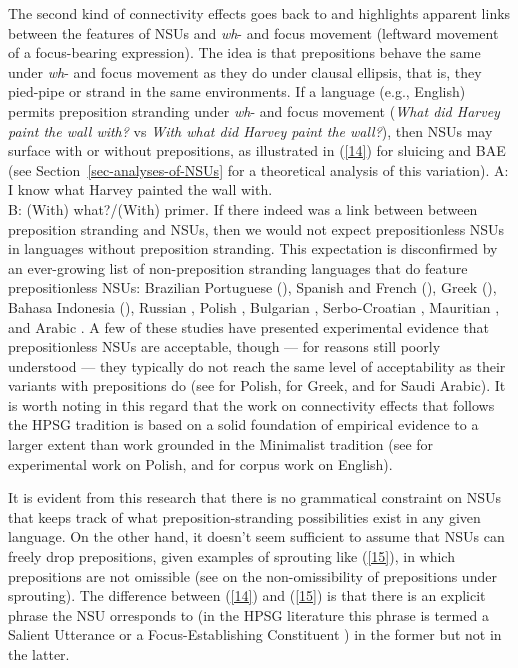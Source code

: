 {The second kind of connectivity effects goes back to \citet{Merchant2001, Merchant2005a} and highlights apparent links between the features of NSUs and \emph{wh}- and focus movement (leftward movement of a focus-bearing expression). The idea is that prepositions behave the same under \emph{wh}- and focus movement as they do under clausal ellipsis, that is, they pied-pipe or strand in the same environments. If a language (e.g., English) permits preposition stranding under \emph{wh}- and focus movement (\emph{What did Harvey paint the wall with?} vs \emph{With what did Harvey paint the wall?}), then NSUs may surface with or without prepositions, as illustrated in (\ref{14}) for sluicing and BAE (see Section~\ref{sec-analyses-of-NSUs} for a theoretical analysis of this variation).
%
\ea A: I know what Harvey painted the wall with.\\B: (With) what?/(With) primer.\label{14}\z
%
If there indeed was a link between between preposition stranding and NSUs, then we would not expect prepositionless NSUs in languages without preposition stranding. This expectation is disconfirmed by an ever-growing list of non-preposition stranding languages that do feature prepositionless NSUs: Brazilian Portuguese (\citealt{AlmeidaYoshida2007}), Spanish and French (\citealt{Rodrigues2006}), Greek (\citealt{Molimpakis2018}), Bahasa Indonesia (\citealt{Fortin2007}), %
 Russian \citep{Philippova2014}, Polish \citep{Szczegielniak2008, Sag2011, Nykiel2013}, %
Bulgarian \citep{Abels2017}, Serbo-Croatian \citep{Stjepanovic2008, Stjepanovic2012}, Mauritian \citet{Abeille2019}, and %
Arabic \citep{Leung2014, Alshaalan2020}. A few of these studies have presented experimental evidence that prepositionless NSUs are acceptable, though --- for reasons still poorly understood --- they typically do not reach the same level of acceptability as their variants with prepositions do (see \citealt{Nykiel2013} for Polish, \citealt{Molimpakis2018} for Greek, and \citealt{Alshaalan2020} for Saudi Arabic). It is worth noting in this regard that the work on connectivity effects that follows the HPSG tradition is based on a solid foundation of empirical evidence to a larger extent than work grounded in the Minimalist tradition (see \citealt{Sag2011, Nykiel2013} for experimental work on Polish, and \citealt{Nykiel2015, Nykiel2017, Nykiel2020} for corpus work on English).

It is evident from this research that there is no grammatical constraint on NSUs that keeps track of what preposition-stranding possibilities exist in any given language. On the other hand, it doesn't seem sufficient to assume that NSUs can freely drop prepositions, given examples of sprouting like (\ref{15}), in which prepositions are not omissible (see \citealt{Chung1995} on the non-omissibility of prepositions under sprouting). The difference between (\ref{14}) and (\ref{15}) is that there is an explicit phrase the NSU  orresponds to (in the HPSG literature this phrase is termed a Salient Utterance \citep[313]{Ginzburg:Sag:2000} or a Focus-Establishing Constituent \citealt{Ginzburg2012}) in the former but not in the latter.

}
